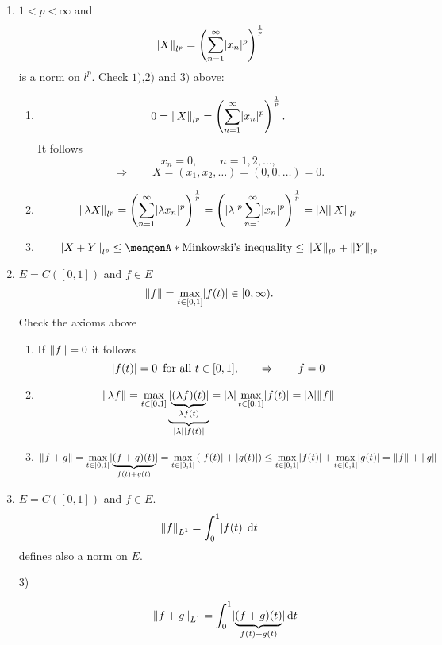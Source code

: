 \begin{beispiele}
	\begin{enumerate}[(1)]
		\item $1 < p < \infty$ and 
	\[
		\norm{X}_{l^p} = \left( \sum_{n=1}^{\infty} \abs{x_n}^p \right)^{\frac{1}{p}}
	\]
	is a norm on $l^p$. Check $1)$,$2)$ and $3)$ above:
	\begin{enumerate}[1)]
		\item \phantom{1} \[
			0 = \norm{X}_{l^p} = \left( \sum_{n=1}^{\infty} \abs{x_n}^p \right)^{\frac{1}{p}}.
		\]
		It follows
		\[
			x_n=0, \qquad n=1,2,\dots,
		\]
		\[
			\Rightarrow \qquad X = (x_1,x_2, \dots) = (0,0,\dots) = 0.
		\]
		\item \phantom{1}\[
			\norm{\lambda X}_{l^p} = \left( \sum_{n=1}^{\infty} \abs{\lambda x_n}^p \right)^{\frac{1}{p}} 
			= \left( \abs{\lambda}^p \sum_{n=1}^{\infty} \abs{x_n}^p \right)^{\frac{1}{p}} = \abs{\lambda} \norm{X}_{l^p}
		\]
		\item \phantom{1}\[
			\norm{X+Y}_{l^p} \leq \set{\text{Minkowski's inequality}} \leq \norm{X}_{l^p} + \norm{Y}_{l^p}
		\]
	\end{enumerate}
	\item $E = C([0,1])$ and $f \in E$
	\[
		\norm{f} = \max\limits_{t \in [0,1]} \abs{f(t)} \in [0,\infty).
	\]
	Check the axioms above
	\begin{enumerate}[1)]
		\item If $\norm{f} = 0$ it follows
		\[
			\lvert f(t)\rvert = 0 \,\text{ for all }t \in [0,1], \qquad \Rightarrow \qquad f=0
		\]
		\item \[
			\norm{\lambda f} = \max\limits_{t \in [0,1]} \underset{\abs{\lambda}\abs{f(t)}}{\underbrace{\abs{\underset{\lambda f(t)}{\underbrace{(\lambda f)(t)}}}}}
			= \abs{\lambda} \max\limits_{t \in [0,1]} \abs{f(t)} = \abs{\lambda} \norm{f}
		\]
		\item 
		\[
			\norm{f+g} = \max\limits_{t \in [0,1]} \abs{\underset{f(t)+g(t)}{\underbrace{(f+g)(t)}}} = \max\limits_{t \in [0,1]}  \left( \abs{f(t)} + \abs{g(t)} \right)
			\leq \max\limits_{t \in [0,1]} \abs{f(t)} + \max\limits_{t \in [0,1]} \abs{g(t)} = \norm{f} + \norm{g}
		\]
	\end{enumerate}
	\item $E = C([0,1])$ and $f \in E$.
	\[
		\norm{f}_{L^1} = \int_{0}^{1} \abs{f(t)} \,\mathrm{d}t 
	\]
	defines also a norm on $E$.
	\begin{description}
		\item[3)]
		\begin{align*}
			\norm{f+g}_{L^1} &= \int_{0}^{1} \abs{\underset{f(t)+g(t)}{\underbrace{(f+g)(t)}}} \,\mathrm{d}t \\

\end{align*}
\end{description}
\end{enumerate}
\end{beispiele}
